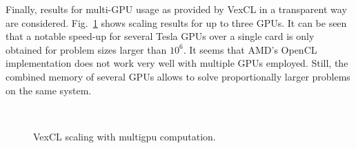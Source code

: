 \documentclass[final]{siamltex}
\newcommand{\figref}[1]{Fig.~\ref{#1}}
\begin{document}
Finally, results for multi-GPU usage as provided by VexCL in a transparent way
are considered. \figref{fig:scaling} shows scaling results for up to three
GPUs. It can be seen that a notable speed-up for several Tesla GPUs over a
single card is only obtained for problem sizes larger than $10^6$.  It seems
that AMD's OpenCL implementation does not work very well with multiple GPUs
employed. Still, the combined memory of several GPUs allows to solve proportionally
larger problems on the same system.

\begin{figure}
    \begin{center}
        $\;$
        $\;$
    \end{center}
    \caption{VexCL scaling with multigpu computation.}
    \label{fig:scaling}
\end{figure}
\end{document}
